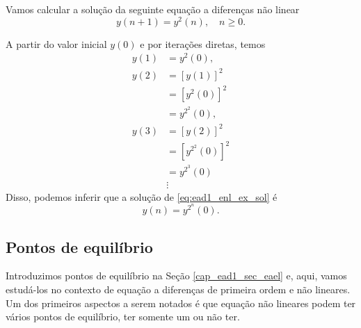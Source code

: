 \begin{ex}
  Vamos calcular a solução da seguinte equação a diferenças não linear
  \begin{equation}\label{eq:ead1_enl_ex_sol}
    y(n+1) = y^2(n),\quad n\geq 0.
  \end{equation}

  A partir do valor inicial $y(0)$ e por iterações diretas, temos
  \begin{align}
    y(1) &= y^2(0),\\
    y(2) &= [y(1)]^2 \\
         &= \left[y^2(0)\right]^2 \\
         &= y^{2^2}(0),\\
    y(3) &= [y(2)]^2 \\
         &= \left[y^{2^2}(0)\right]^2 \\
         &= y^{2^3}(0) \\
         &\vdots
  \end{align}
  Disso, podemos inferir que a solução de \ref{eq:ead1_enl_ex_sol} é
  \begin{equation}
    y(n) = y^{2^n}(0).
  \end{equation}
\end{ex}

\subsection{Pontos de equilíbrio}

Introduzimos pontos de equilíbrio na Seção \ref{cap_ead1_sec_eael} e, aqui, vamos estudá-los no contexto de equação a diferenças de primeira ordem e não lineares. Um dos primeiros aspectos a serem notados é que equação não lineares podem ter vários pontos de equilíbrio, ter somente um ou não ter.

